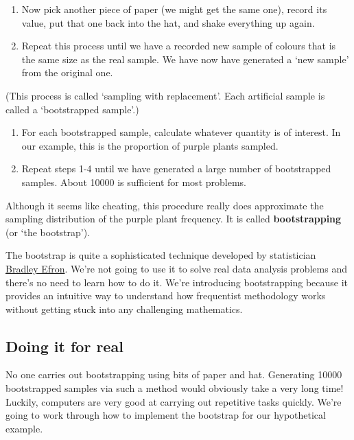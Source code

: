 \documentclass[
]{book}
\begin{document}
\begin{enumerate}
\def\labelenumi{\arabic{enumi}.}
\setcounter{enumi}{1}
\item
  Now pick another piece of paper (we might get the same one), record its value, put that one back into the hat, and shake everything up again.
\item
  Repeat this process until we have a recorded new sample of colours that is the same size as the real sample. We have now have generated a `new sample' from the original one.
\end{enumerate}

(This process is called `sampling with replacement'. Each artificial sample is called a `bootstrapped sample'.)

\begin{enumerate}
\def\labelenumi{\arabic{enumi}.}
\setcounter{enumi}{3}
\item
  For each bootstrapped sample, calculate whatever quantity is of interest. In our example, this is the proportion of purple plants sampled.
\item
  Repeat steps 1-4 until we have generated a large number of bootstrapped samples. About 10000 is sufficient for most problems.
\end{enumerate}

Although it seems like cheating, this procedure really does approximate the sampling distribution of the purple plant frequency. It is called \textbf{bootstrapping} (or `the bootstrap').

The bootstrap is quite a sophisticated technique developed by statistician \href{https://en.wikipedia.org/wiki/Bradley_Efron}{Bradley Efron}. We're not going to use it to solve real data analysis problems and there's no need to learn how to do it. We're introducing bootstrapping because it provides an intuitive way to understand how frequentist methodology works without getting stuck into any challenging mathematics.

\hypertarget{doing-it-for-real}{%
\subsection{Doing it for real}\label{doing-it-for-real}}

No one carries out bootstrapping using bits of paper and hat. Generating 10000 bootstrapped samples via such a method would obviously take a very long time! Luckily, computers are very good at carrying out repetitive tasks quickly. We're going to work through how to implement the bootstrap for our hypothetical example.
\end{document}
